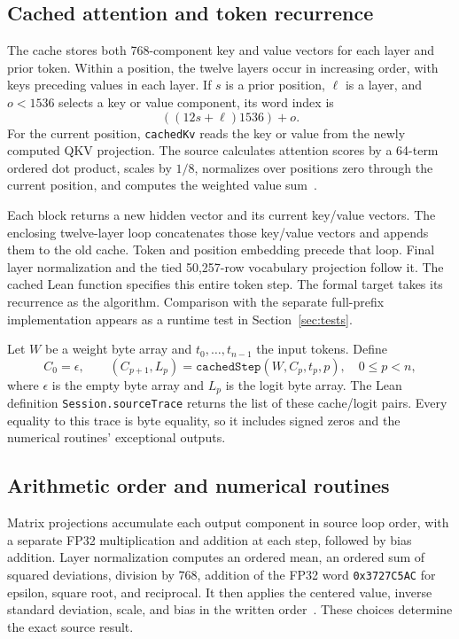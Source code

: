 \documentclass[11pt]{article}
\newcommand{\code}[1]{\texttt{#1}}
\begin{document}
\subsection{Cached attention and token recurrence}

The cache stores both 768-component key and value vectors for each layer and prior token.  Within a position, the twelve layers occur in increasing order, with keys preceding values in each layer.  If $s$ is a prior position, $\ell$ is a layer, and $o<1536$ selects a key or value component, its word index is
\[
((12s+\ell)1536)+o.
\]
For the current position, \code{cachedKv} reads the key or value from the newly computed QKV projection.  The source calculates attention scores by a 64-term ordered dot product, scales by $1/8$, normalizes over positions zero through the current position, and computes the weighted value sum~\cite{cached}.

Each block returns a new hidden vector and its current key/value vectors.  The enclosing twelve-layer loop concatenates those key/value vectors and appends them to the old cache.  Token and position embedding precede that loop.  Final layer normalization and the tied 50,257-row vocabulary projection follow it.  The cached Lean function specifies this entire token step.  The formal target takes its recurrence as the algorithm.  Comparison with the separate full-prefix implementation appears as a runtime test in Section~\ref{sec:tests}.

Let $W$ be a weight byte array and $t_0,\ldots,t_{n-1}$ the input tokens.  Define
\begin{equation}\label{eq:recurrence}
C_0=\epsilon,\qquad
(C_{p+1},L_p)=\code{cachedStep}(W,C_p,t_p,p),\quad 0\leq p<n,
\end{equation}
where $\epsilon$ is the empty byte array and $L_p$ is the logit byte array.  The Lean definition \code{Session.sourceTrace} returns the list of these cache/logit pairs.  Every equality to this trace is byte equality, so it includes signed zeros and the numerical routines' exceptional outputs.

\subsection{Arithmetic order and numerical routines}

Matrix projections accumulate each output component in source loop order, with a separate FP32 multiplication and addition at each step, followed by bias addition.  Layer normalization computes an ordered mean, an ordered sum of squared deviations, division by 768, addition of the FP32 word \code{0x3727C5AC} for epsilon, square root, and reciprocal.  It then applies the centered value, inverse standard deviation, scale, and bias in the written order~\cite{kernels}.  These choices determine the exact source result.
\end{document}
